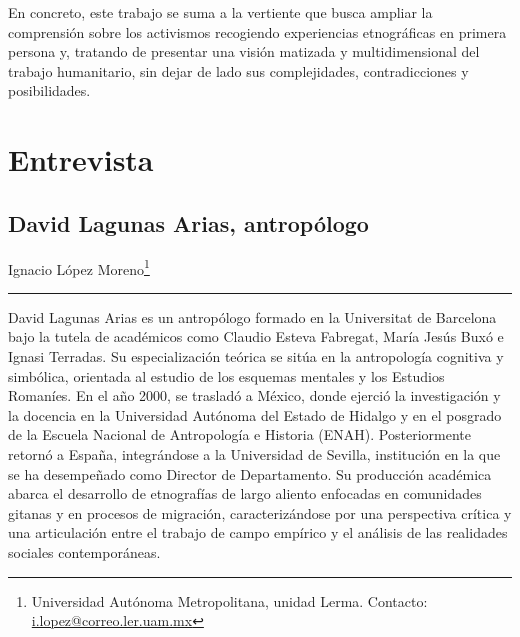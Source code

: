 \documentclass[
  spanish,
  11pt,
  a4paper,
]{scrbook}
\begin{document}
En concreto, este trabajo se suma a la vertiente que busca ampliar la
comprensión sobre los activismos recogiendo experiencias etnográficas en
primera persona y, tratando de presentar una visión matizada y
multidimensional del trabajo humanitario, sin dejar de lado sus
complejidades, contradicciones y posibilidades.

\printbibliography[heading=subbibliography, title={Referencias Bibliográficas}]

\part{Entrevista}

\chapter{David Lagunas Arias,
antropólogo}\label{david-lagunas-arias-antropuxf3logo}


\begin{flushright}
\Large Ignacio López Moreno\footnote{Universidad Autónoma Metropolitana, unidad Lerma. Contacto: \href{i.lopez@correo.ler.uam.mx}{i.lopez@correo.ler.uam.mx}}
\end{flushright}

\begin{center}\rule{0.5\linewidth}{0.5pt}\end{center}

\begingroup
\footnotesize

\noindent David Lagunas Arias es un antropólogo formado en la
Universitat de Barcelona bajo la tutela de académicos como Claudio
Esteva Fabregat, María Jesús Buxó e Ignasi Terradas. Su especialización
teórica se sitúa en la antropología cognitiva y simbólica, orientada al
estudio de los esquemas mentales y los Estudios Romaníes. En el año
2000, se trasladó a México, donde ejerció la investigación y la docencia
en la Universidad Autónoma del Estado de Hidalgo y en el posgrado de la
Escuela Nacional de Antropología e Historia (ENAH). Posteriormente
retornó a España, integrándose a la Universidad de Sevilla, institución
en la que se ha desempeñado como Director de Departamento. Su producción
académica abarca el desarrollo de etnografías de largo aliento enfocadas
en comunidades gitanas y en procesos de migración, caracterizándose por
una perspectiva crítica y una articulación entre el trabajo de campo
empírico y el análisis de las realidades sociales contemporáneas.
\end{document}
